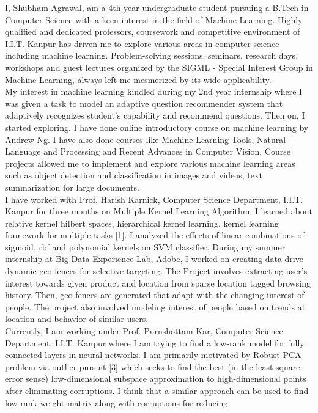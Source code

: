 I, Shubham Agrawal, am a 4th year undergraduate student pursuing a B.Tech in Computer Science with a
keen interest in the field of Machine Learning. Highly qualified and dedicated professors, coursework and
competitive environment of I.I.T. Kanpur has driven me to explore various areas in computer science including machine
learning. Problem-solving sessions, seminars, research days, workshops and guest lectures
organized by the SIGML - Special Interest Group in Machine Learning, always left me mesmerized by its
wide applicability.
\\
My interest in machine learning kindled during my 2nd year internship where I was given a task to model
an adaptive question recommender system that adaptively recognizes student’s capability and recommend
questions. Then on, I started exploring. I have done online introductory course on machine learning by
Andrew Ng. I have also done courses like Machine Learning Tools, Natural Language and Processing and
Recent Advances in Computer Vision. Course projects allowed me to implement and explore various machine
learning areas such as object detection and classification in images and videos, text summarization for large
documents.
\\
I have worked with Prof. Harish Karnick, Computer Science Department, I.I.T. Kanpur for three months
on Multiple Kernel Learning Algorithm. I learned about relative kernel hilbert spaces, hierarchical kernel
learning, kernel learning framework for multiple tasks [1]. I analyzed the effects of linear combinations of
sigmoid, rbf and polynomial kernels on SVM classifier. During my summer internship at Big Data Experience Lab, Adobe, I worked on creating data drive dynamic geo-fences for selective targeting. The Project
involves extracting user’s interest towards given product and location from sparse location tagged browsing
history. Then, geo-fences are generated that adapt with the changing interest of people. The project also
involved modeling interest of people based on trends at location and behavior of similar users.
\\
Currently, I am working under Prof. Purushottam Kar, Computer Science Department, I.I.T. Kanpur
where I am trying to find a low-rank model for fully connected layers in neural networks. I am primarily motivated by Robust PCA problem via outlier pursuit [3] which seeks to find the best (in the least-square-error
sense) low-dimensional subspace approximation to high-dimensional points after eliminating corruptions. I
think that a similar approach can be used to find low-rank weight matrix along with corruptions for reducing
